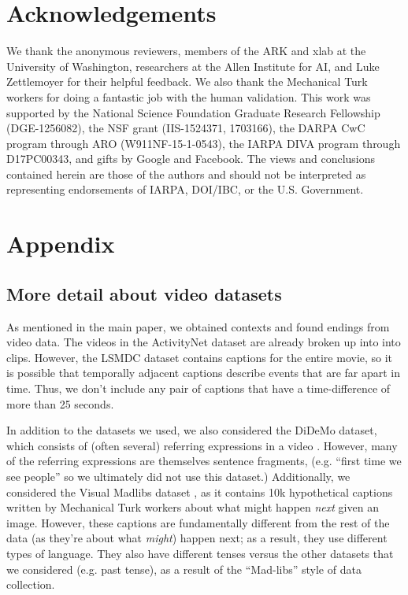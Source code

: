 \documentclass[11pt,a4paper]{article}
\begin{document}
\section*{Acknowledgements}
We thank the anonymous reviewers, members of the ARK and xlab at the University of Washington, researchers at the Allen Institute for AI, and Luke Zettlemoyer for their helpful feedback. We also thank the Mechanical Turk workers for doing a fantastic job with the human validation. This work was supported by the National Science Foundation Graduate Research Fellowship (DGE-1256082), the NSF grant (IIS-1524371, 1703166), the DARPA CwC program through ARO (W911NF-15-1-0543), the IARPA DIVA program through D17PC00343, and gifts by Google and Facebook. The views and conclusions contained herein are those of the authors and should not be interpreted as 
representing endorsements 
of IARPA, DOI/IBC, or the U.S. Government.

\appendix
\section{Appendix}


\subsection{More detail about video datasets}
As mentioned in the main paper, we obtained contexts and found endings from video data. The videos in the ActivityNet dataset are already broken up into into clips. However, the LSMDC dataset contains captions for the entire movie, so it is possible that temporally adjacent captions describe events that are far apart in time. Thus, we don't include any pair of captions that have a time-difference of more than 25 seconds.

In addition to the datasets we used, we also considered the DiDeMo dataset, which consists of (often several) referring expressions in a video \cite{hendricks17iccv}. However, many of the referring expressions are themselves sentence fragments, (e.g. ``first time we see people'' so we ultimately did not use this dataset.) Additionally, we considered the Visual Madlibs dataset \cite{yu_visual_2015}, as it contains 10k hypothetical captions written by Mechanical Turk workers about what might happen \emph{next} given an image. However, these captions are fundamentally different from the rest of the data (as they're about what \emph{might}) happen next; as a result, they use different types of language. They also have different tenses versus the other datasets that we considered (e.g. past tense), as a result of the ``Mad-libs'' style of data collection.
\end{document}

